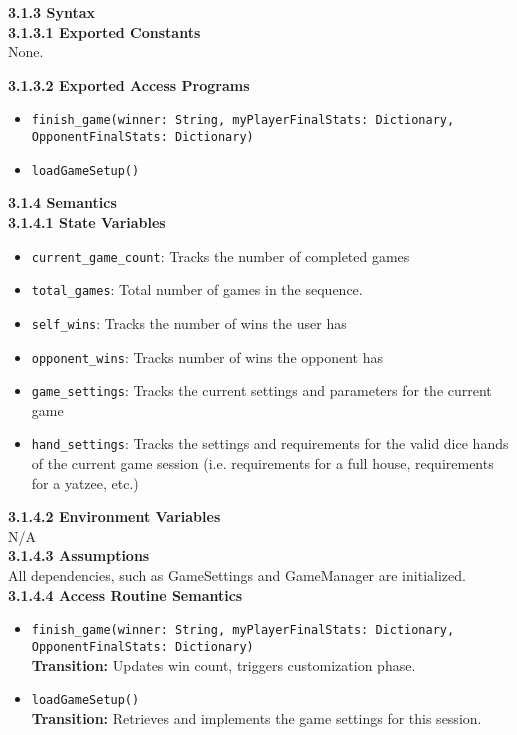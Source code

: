 \documentclass[12pt, titlepage]{article}
\begin{document}
\noindent \textbf{3.1.3 Syntax}\\
\textbf{3.1.3.1 Exported Constants}\\
None.  

\noindent \textbf{3.1.3.2 Exported Access Programs}
\begin{itemize}
    \item \texttt{finish\_game(winner: String, myPlayerFinalStats: Dictionary, OpponentFinalStats: Dictionary)}
    \item \texttt{loadGameSetup()}
\end{itemize}

\textbf{3.1.4 Semantics}\\
\textbf{3.1.4.1 State Variables}\\
\begin{itemize}
    \item \texttt{current\_game\_count}: Tracks the number of completed games
    \item \texttt{total\_games}: Total number of games in the sequence.
    \item \texttt{self\_wins}: Tracks the number of wins the user has 
    \item \texttt{opponent\_wins}: Tracks number of wins the opponent has
    \item \texttt{game\_settings}: Tracks the current settings and parameters for the current game
    \item \texttt{hand\_settings}: Tracks the settings and requirements for the valid dice hands of the current game session (i.e. requirements for a full house, requirements for a yatzee, etc.)

\end{itemize}

\textbf{3.1.4.2 Environment Variables}\\

N/A\\

\textbf{3.1.4.3 Assumptions}\\

All dependencies, such as GameSettings and GameManager are initialized.\\

\textbf{3.1.4.4 Access Routine Semantics}
\begin{itemize}

    \item \texttt{finish\_game(winner: String, myPlayerFinalStats: Dictionary, OpponentFinalStats: Dictionary)}\\
    \textbf{Transition:} Updates win count, triggers customization phase.
    
    \item \texttt{loadGameSetup()}\\
    \textbf{Transition:} Retrieves and implements the game settings for this session.

\end{itemize}
\end{document}
